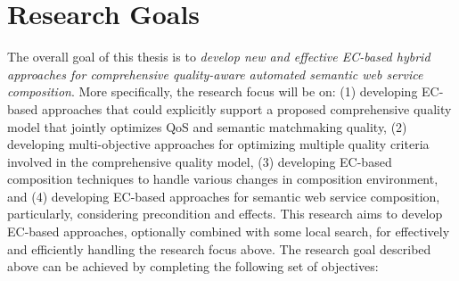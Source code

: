  
\section{Research Goals}
The overall goal of this thesis is to \emph{develop new and effective EC-based hybrid approaches for comprehensive quality-aware automated semantic web service composition}. More specifically, the research focus will be on: (1) developing EC-based approaches that could explicitly support a proposed comprehensive quality model that jointly optimizes QoS and semantic matchmaking quality, (2) developing multi-objective approaches for optimizing multiple quality criteria involved in the comprehensive quality model, (3) developing EC-based composition techniques to handle various changes in composition environment, and  (4) developing EC-based approaches for semantic web service composition, particularly, considering precondition and effects. This research aims to develop EC-based approaches, optionally combined with some local search, for effectively and efficiently handling the research focus above. The research goal described above can be achieved by completing the following set of objectives:


